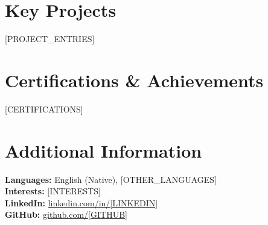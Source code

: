\documentclass[11pt,a4paper]{article}
\newcommand{\cvproject}[4]{
    \textbf{#1} \hfill {\color{secondarycolor}#2}\\
    \textit{#3}\\
    #4
    \vspace{0.2cm}
}
\begin{document}
\section{Key Projects}
[PROJECT_ENTRIES]

\section{Certifications \& Achievements}
[CERTIFICATIONS]

\section{Additional Information}
\textbf{Languages:} English (Native), [OTHER_LANGUAGES]\\
\textbf{Interests:} [INTERESTS]\\
\textbf{LinkedIn:} \href{https://linkedin.com/in/[LINKEDIN]}{linkedin.com/in/[LINKEDIN]}\\
\textbf{GitHub:} \href{https://github.com/[GITHUB]}{github.com/[GITHUB]}
\end{document}
